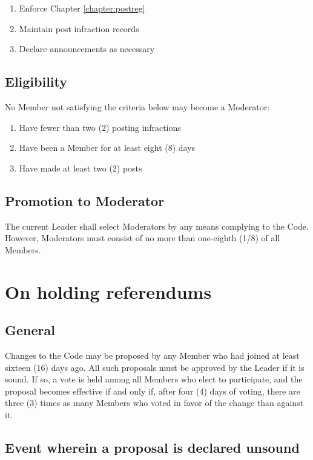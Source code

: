 \documentclass[10pt]{book}
\begin{document}
\begin{enumerate}
 \item Enforce Chapter \ref{chapter:postreg}
 \item Maintain post infraction records
 \item Declare announcements as necessary
\end{enumerate}

\subsection{Eligibility}

No Member not satisfying the criteria below may become a Moderator:

\begin{enumerate}
 \item Have fewer than two (2) posting infractions
 \item Have been a Member for at least eight (8) days
 \item Have made at least two (2) posts
\end{enumerate}

\subsection{Promotion to Moderator}

The current Leader shall select Moderators by any means complying to the Code. However, Moderators must consist of no more than one-eighth (1/8) of all Members.

\section{On holding referendums}

\subsection{General}

Changes to the Code may be proposed by any Member who had joined at least sixteen (16) days ago. All such proposals must be approved by the Leader if it is sound. If so, a vote is held among all Members who elect to participate, and the proposal becomes effective if and only if, after four (4) days of voting, there are three (3) times as many Members who voted in favor of the change than against it.

\subsection{Event wherein a proposal is declared unsound}
\end{document}

